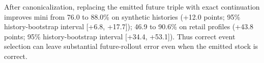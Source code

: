 After canonicalization, replacing the emitted future triple with exact continuation improves mini from 76.0 to 88.0\% on synthetic histories (+12.0 points; 95\% history-bootstrap interval [+6.8, +17.7]); 46.9 to 90.6\% on retail profiles (+43.8 points; 95\% history-bootstrap interval [+34.4, +53.1]). Thus correct event selection can leave substantial future-rollout error even when the emitted stock is correct.
